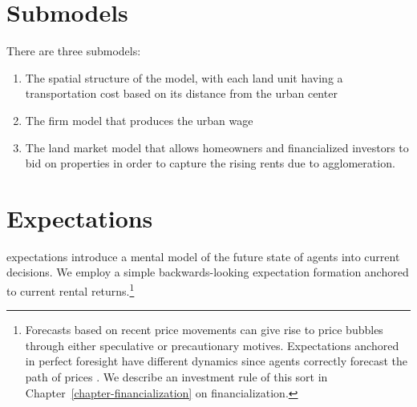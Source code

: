 \section{Submodels}
There are three submodels: 
\begin{enumerate}
    \item The spatial structure of the model, with each land unit having a transportation cost based on its distance from the urban center
    \item The firm model that produces the urban wage
    \item The land market model that allows homeowners and financialized investors to bid on properties in order to capture the rising rents due to agglomeration.  
\end{enumerate}





\section{Expectations}
\Glspl{expectation} introduce a mental model of the future state of agents into current decisions.  We employ a simple backwards-looking expectation formation anchored 
to current rental returns.\footnote{Forecasts based on recent price movements can give rise to \glspl{price bubble} through either speculative or precautionary motives. Expectations anchored in \gls{perfect foresight} have different dynamics since agents correctly forecast the path of prices \cite{muthRationalExpectationsTheory1961}.  We describe an investment rule of this sort in Chapter~\ref{chapter-financialization} on financialization.} 



